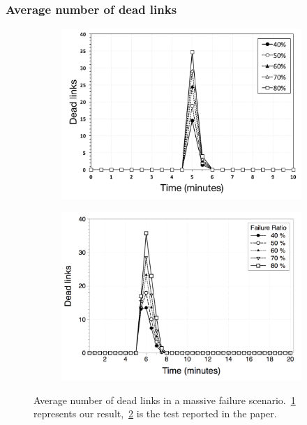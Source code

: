 \documentclass{beamer}
\begin{document}
\begin{frame}
\frametitle{Average number of dead links}
    
\begin{figure}
\centering
\begin{subfigure}{.5\textwidth}
  \centering
  \includegraphics[keepaspectratio=true, width=1\linewidth]{images/average_dead_links}
  \caption{}
  \label{fig:average_dead_links}
\end{subfigure}%
\begin{subfigure}{.5\textwidth}
  \centering
  \includegraphics[keepaspectratio=true, width=1\linewidth]{images/paper_average_dead_links}
  \caption{}
  \label{fig:paper_average_dead_links}
\end{subfigure}
\caption{Average number of dead links in a massive failure scenario.~\ref{fig:average_dead_links} represents our result,~\ref{fig:paper_average_dead_links} is the test reported in the paper.}
\label{fig:robustness_dead_links_failures}
\end{figure}

\end{frame}
\end{document}
